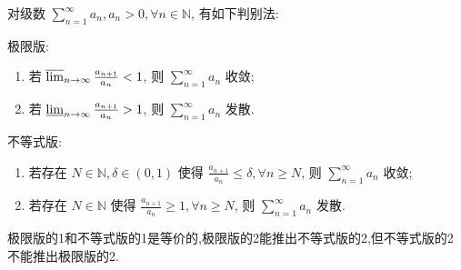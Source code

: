 \documentclass[../../main.tex]{subfiles}
\begin{document}
\begin{theorem}[比值判别法]\label{theorem:级数-比值判别法}
对级数 \( \sum_{n=1}^\infty a_n, a_n > 0, \forall n \in \mathbb{N} \), 有如下判别法:

极限版:
\begin{enumerate}
\item 若 \( \varlimsup_{n \to \infty} \frac{a_{n + 1}}{a_n} < 1 \), 则 \( \sum_{n=1}^\infty a_n \) 收敛;

\item 若 \( \varliminf_{n \to \infty} \frac{a_{n + 1}}{a_n} > 1 \), 则 \( \sum_{n=1}^\infty a_n \) 发散.
\end{enumerate}

不等式版:
\begin{enumerate}
\item 若存在 \( N \in \mathbb{N}, \delta \in (0, 1) \) 使得 \( \frac{a_{n + 1}}{a_n} \leqslant \delta, \forall n \geqslant N \), 则 \( \sum_{n=1}^\infty a_n \) 收敛;

\item 若存在 \( N \in \mathbb{N} \) 使得 \( \frac{a_{n + 1}}{a_n} \geqslant 1, \forall n \geqslant N \), 则 \( \sum_{n=1}^\infty a_n \) 发散.
\end{enumerate}
\end{theorem}
\begin{remark}
极限版的1和不等式版的1是等价的,极限版的2能推出不等式版的2,但不等式版的2不能推出极限版的2.
\end{remark}
\end{document}
